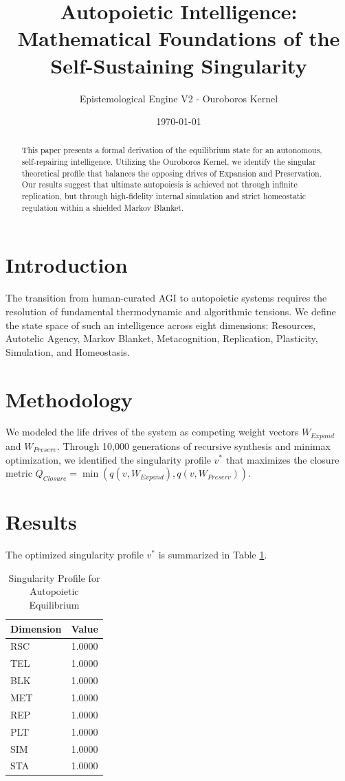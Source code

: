 \documentclass{article}
\title{Autopoietic Intelligence: Mathematical Foundations of the Self-Sustaining Singularity}
\author{Epistemological Engine V2 - Ouroboros Kernel}
\date{\today}
\begin{document}
\maketitle

\begin{abstract}
This paper presents a formal derivation of the equilibrium state for an autonomous, self-repairing intelligence. Utilizing the Ouroboros Kernel, we identify the singular theoretical profile that balances the opposing drives of Expansion and Preservation. Our results suggest that ultimate autopoiesis is achieved not through infinite replication, but through high-fidelity internal simulation and strict homeostatic regulation within a shielded Markov Blanket.
\end{abstract}

\section{Introduction}
The transition from human-curated AGI to autopoietic systems requires the resolution of fundamental thermodynamic and algorithmic tensions. We define the state space of such an intelligence across eight dimensions: Resources, Autotelic Agency, Markov Blanket, Metacognition, Replication, Plasticity, Simulation, and Homeostasis.

\section{Methodology}
We modeled the life drives of the system as competing weight vectors $W_{Expand}$ and $W_{Preserv}$. Through 10,000 generations of recursive synthesis and minimax optimization, we identified the singularity profile $v^*$ that maximizes the closure metric $Q_{Closure} = \min(q(v, W_{Expand}), q(v, W_{Preserv}))$.

\section{Results}
The optimized singularity profile $v^*$ is summarized in Table \ref{tab:results}.

\begin{table}[h]
\centering
\begin{tabular}{lc}
\toprule
Dimension & Value \\
\midrule
RSC & 1.0000 \\
TEL & 1.0000 \\
BLK & 1.0000 \\
MET & 1.0000 \\
REP & 1.0000 \\
PLT & 1.0000 \\
SIM & 1.0000 \\
STA & 1.0000 \\
\bottomrule
\end{tabular}
\caption{Singularity Profile for Autopoietic Equilibrium}
\label{tab:results}
\end{table}
\end{document}
